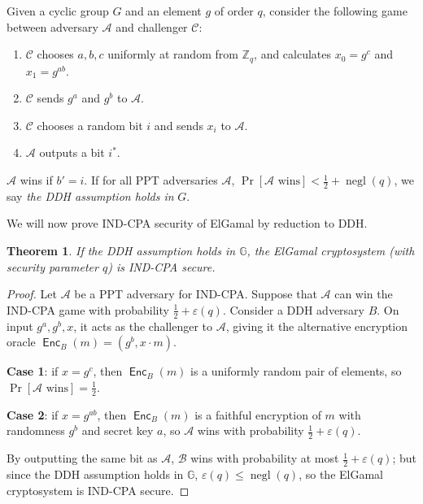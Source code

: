 \documentclass[12pt,a4paper]{article}
\DeclareMathOperator{\negl}{\text{negl}}
\DeclareMathOperator{\Enc}{\mathsf{Enc}}
\newtheorem{theorem}{Theorem}
\theoremstyle{definition}
\begin{document}
\begin{definition}
    Given a cyclic group $G$ and an element $g$ of order $q$, consider the following game between adversary $\mathcal{A}$ and challenger $\mathcal{C}$:
    \begin{enumerate}
        \item $\mathcal{C}$ chooses $a, b, c$ uniformly at random from $\mathbb{Z}_q$, and calculates $x_0=g^c$ and $x_1=g^{ab}$.
        \item $\mathcal{C}$ sends $g^a$ and $g^b$ to $\mathcal{A}$.
        \item $\mathcal{C}$ chooses a random bit $i$ and sends $x_i$ to $\mathcal{A}$.
        \item $\mathcal{A}$ outputs a bit $i^*$.
    \end{enumerate}
    $\mathcal{A}$ wins if $b' = i$. If for all PPT adversaries $\mathcal{A}$, $\Pr[\mathcal{A}\text{ wins}]<\frac{1}{2}+\negl(q)$, we say \textit{the DDH assumption holds in} $G$.
\end{definition}

We will now prove IND-CPA security of ElGamal by reduction to DDH.
\begin{theorem}
    If the DDH assumption holds in $\mathbb{G}$, the ElGamal cryptosystem (with security parameter $q$) is IND-CPA secure.
\end{theorem}
\begin{proof}
    Let $\mathcal{A}$ be a PPT adversary for IND-CPA. Suppose that $\mathcal{A}$ can win the IND-CPA game with probability $\frac{1}{2}+\varepsilon(q)$. Consider a DDH adversary $B$. On input $g^a, g^b, x$, it acts as the challenger to $\mathcal{A}$, giving it the alternative encryption oracle $\Enc_B(m)=(g^b, x\cdot m)$.
    
    \textbf{Case 1}: if $x=g^c$, then $\Enc_B(m)$ is a uniformly random pair of elements, so $\Pr[\mathcal{A}\text{ wins}]=\frac{1}{2}$.
    
    \textbf{Case 2}: if $x=g^{ab}$, then $\Enc_B(m)$ is a faithful encryption of $m$ with randomness $g^b$ and secret key $a$, so $\mathcal{A}$ wins with probability $\frac{1}{2}+\varepsilon(q)$.

    By outputting the same bit as $\mathcal{A}$, $\mathcal{B}$ wins with probability at most $\frac{1}{2}+\varepsilon(q)$; but since the DDH assumption holds in $\mathbb{G}$, $\varepsilon(q)\leq\negl(q)$, so the ElGamal cryptosystem is IND-CPA secure.
\end{proof}
\end{document}
